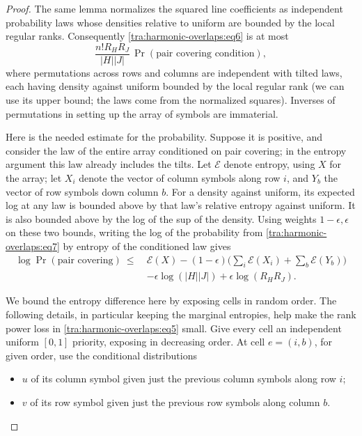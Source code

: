 \begin{proof}
The same lemma normalizes the squared line coefficients as independent
probability laws whose densities relative to uniform are bounded by
the local regular ranks. Consequently \eqref{tra:harmonic-overlaps:eq6}
is at most
\begin{equation}
       \frac{n! R_H R_J}{|H||J|}\,\Pr(\text{pair covering condition}),     \label{tra:harmonic-overlaps:eq7}
\end{equation}
where permutations across rows and columns are independent with tilted laws, each having density against uniform bounded by the local regular rank (we can use its upper bound; the laws come from the normalized squares). Inverses of permutations in setting up the array of symbols are immaterial.

Here is the needed estimate for the probability. Suppose it is positive, and consider the law of the entire array conditioned on pair covering; in the entropy argument this law already includes the tilts. Let \(\mathcal E\) denote entropy, using \(X\) for the array; let \(X_i\) denote the vector of column symbols along row \(i\), and \(Y_b\) the vector of row symbols down column \(b\). For a density against uniform, its expected log at any law is bounded above by that law's relative entropy against uniform. It is also bounded above by the log of the sup of the density. Using weights \(1-\epsilon,\epsilon\) on these two bounds, writing the log of the probability from \eqref{tra:harmonic-overlaps:eq7} by entropy of the conditioned law gives
\begin{equation}
\begin{split}
 \log\Pr(\text{pair covering})
 \ \le\ &\mathcal E(X)
   -(1-\epsilon)\Big(\sum_i\mathcal E(X_i)+\sum_b\mathcal E(Y_b)\Big)\\
 &-\epsilon\log(|H||J|) + \epsilon\log(R_H R_J).                        \end{split}
\label{tra:harmonic-overlaps:eq8}
\end{equation}

\label{tra:harmonic-overlaps:random-cell-priorities}
We bound the entropy difference here by exposing cells in random order. The following details, in particular keeping the marginal entropies, help make the rank power loss in \eqref{tra:harmonic-overlaps:eq5} small. Give every cell an independent uniform \([0,1]\) priority, exposing in decreasing order. At cell \(e=(i,b)\), for given order, use the conditional distributions
\begin{itemize}
\item \(u\) of its column symbol given just the previous column symbols along row \(i\);
\item \(v\) of its row symbol given just the previous row symbols along column \(b\).


\end{itemize}
\end{proof}

